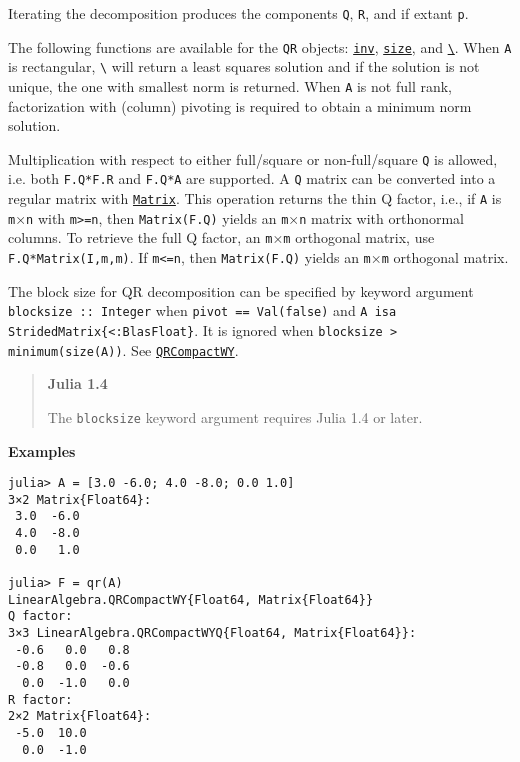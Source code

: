 \begin{adjustwidth}{2em}{0pt}
\begin{itemize}
\end{itemize}
Iterating the decomposition produces the components \texttt{Q}, \texttt{R}, and if extant \texttt{p}.

The following functions are available for the \texttt{QR} objects: \hyperlink{13336866048543706848}{\texttt{inv}}, \hyperlink{17888996102305087038}{\texttt{size}}, and \hyperlink{2092789550033334797}{\texttt{{\textbackslash}}}. When \texttt{A} is rectangular, \texttt{{\textbackslash}} will return a least squares solution and if the solution is not unique, the one with smallest norm is returned. When \texttt{A} is not full rank, factorization with (column) pivoting is required to obtain a minimum norm solution.

Multiplication with respect to either full/square or non-full/square \texttt{Q} is allowed, i.e. both \texttt{F.Q*F.R} and \texttt{F.Q*A} are supported. A \texttt{Q} matrix can be converted into a regular matrix with \hyperlink{5448927444601277512}{\texttt{Matrix}}.  This operation returns the {\textquotedbl}thin{\textquotedbl} Q factor, i.e., if \texttt{A} is \texttt{m}×\texttt{n} with \texttt{m>=n}, then \texttt{Matrix(F.Q)} yields an \texttt{m}×\texttt{n} matrix with orthonormal columns.  To retrieve the {\textquotedbl}full{\textquotedbl} Q factor, an \texttt{m}×\texttt{m} orthogonal matrix, use \texttt{F.Q*Matrix(I,m,m)}.  If \texttt{m<=n}, then \texttt{Matrix(F.Q)} yields an \texttt{m}×\texttt{m} orthogonal matrix.

The block size for QR decomposition can be specified by keyword argument \texttt{blocksize :: Integer} when \texttt{pivot == Val(false)} and \texttt{A isa StridedMatrix\{<:BlasFloat\}}. It is ignored when \texttt{blocksize > minimum(size(A))}.  See \hyperlink{15814215390089782499}{\texttt{QRCompactWY}}.

\begin{quote}
\textbf{Julia 1.4}

The \texttt{blocksize} keyword argument requires Julia 1.4 or later.

\end{quote}
\textbf{Examples}


\begin{verbatim}
julia> A = [3.0 -6.0; 4.0 -8.0; 0.0 1.0]
3×2 Matrix{Float64}:
 3.0  -6.0
 4.0  -8.0
 0.0   1.0

julia> F = qr(A)
LinearAlgebra.QRCompactWY{Float64, Matrix{Float64}}
Q factor:
3×3 LinearAlgebra.QRCompactWYQ{Float64, Matrix{Float64}}:
 -0.6   0.0   0.8
 -0.8   0.0  -0.6
  0.0  -1.0   0.0
R factor:
2×2 Matrix{Float64}:
 -5.0  10.0
  0.0  -1.0


\end{verbatim}
\end{adjustwidth}
